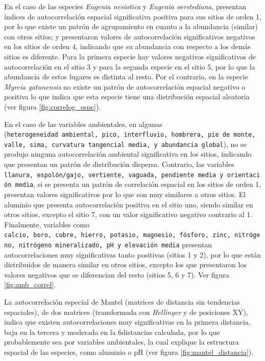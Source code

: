 \documentclass[11pt,]{article}
\begin{document}
En el caso de las especies \emph{Eugenia nesiotica} y \emph{Eugenia
oerstediana}, presentan índices de autocorrelación espacial
significativa positiva para sus sitios de orden 1, por lo que existe un
patrón de agrupamiento en cuanto a la abundancia (similar) con otros
sitios; y presentaron valores de autocorrelación significativos
negativos en los sitios de orden 4, indicando que su abundancia con
respecto a los demás sitios es diferente. Para la primera especie hay
valores negativos significativos de autocorrelación en el sitio 3 y para
la segunda especie en el sitio 5, por lo que la abundancia de estos
lugares es distinta al resto. Por el contrario, en la especie
\emph{Myrcia gatunensis} no existe un patrón de autocorrelación espacial
negativo o positiva lo que indica que esta especie tiene una
distribución espacial aleatoria (ver figura \ref{fig:correlog_espc}).

En el caso de las variables ambientales, en algunas
(\texttt{heterogeneidad\ ambiental,\ pico,\ interfluvio,\ hombrera,\ pie\ de\ monte,\ valle,\ sima,\ curvatura\ tangencial\ media,\ y\ abundancia\ global}),
no se produjo ninguna autocorrelación ambiental significativa en los
sitios, indicando que presentan un patrón de distribución dispersa.
Contrario, las variables
\texttt{llanura,\ espolón/gajo,\ vertiente,\ vaguada,\ pendiente\ media\ y\ orientación\ media},
si se presenta un patrón de correlación espacial en los sitios de orden
1, presentan valores significativos por lo que son muy similares a otros
sitios. El aluminio que presenta autocorrelación positiva en el sitio
uno, siendo similar en otros sitios, excepto el sitio 7, con un valor
significativo negativo contrario al 1. Finalmente, variables como
\texttt{calcio,\ boro,\ cobre,\ hierro,\ potasio,\ magnesio,\ fósforo,\ zinc,\ nitrógeno,\ nitrógeno\ mineralizado,\ pH\ y\ elevación\ media}
presentan autocorrelaciones muy significativas tanto positivas (sitios 1
y 2), por lo que están distribuidos de manera similar en otros sitios,
excepto los que presentaron los valores negativos que se diferencian del
resto (sitios 5, 6 y 7). Ver figura \ref{fig:amb_correl}.

La autocorrelación especial de Mantel (matrices de distancia sin
tendencias espaciales), de dos matrices (transformada con
\emph{Hellinger} y de posiciones XY), indica que existen
autocorrelaciones muy significativas en la primera distancia, baja en la
tercera y moderada en la 6distancias calculada, por lo que probablemente
sea por variables ambientales, la cual explique la estructura espacial
de las especies, como aluminio o pH (ver figura
\ref{fig:mantel_distancia}).
\end{document}
